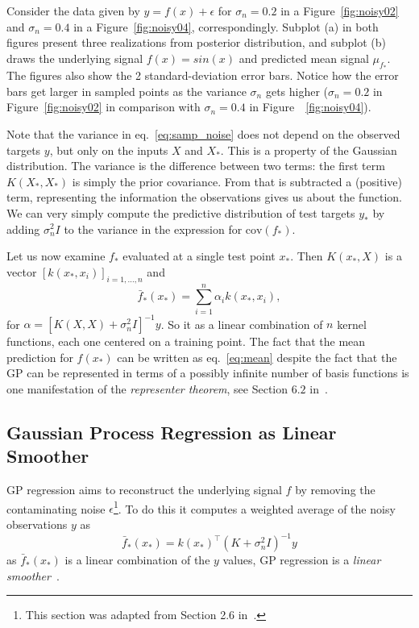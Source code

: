 \documentclass{article}[12pt]
\def\eps{\epsilon}
\newcommand{\cov}{\mathrm{cov}}
\begin{document}
Consider the data given by $y=f(x)+\eps$ for $\sigma_n=0.2$ in a Figure~\ref{fig:noisy02} and $\sigma_n=0.4$ in a Figure~\ref{fig:noisy04}, correspondingly. 
Subplot (a) in both figures present three realizations from posterior distribution, and subplot (b) draws the underlying signal $f(x)=sin(x)$ and predicted mean signal $\mu_{f_*}$.
The figures also show the 2 standard-deviation error bars. Notice how the error bars get larger in sampled points as the variance $\sigma_n$ gets higher ($\sigma_n=0.2$ in Figure~\ref{fig:noisy02} in comparison with $\sigma_n=0.4$ in Figure~~\ref{fig:noisy04}).

Note that the variance in eq.~\eqref{eq:samp_noise} does not depend on the observed targets $y$, but only on the inputs $X$ and $X_*$. This is a property of the Gaussian distribution.
The variance is the difference between two terms: the first term $K(X_*, X_*)$ is simply the prior covariance. From that is subtracted a (positive) term, representing the information the observations gives us about the function. 
We can very simply compute the predictive distribution of test targets $y_*$ by adding $\sigma_n^2 I$ to the variance in the expression for $\cov(f_*)$.


Let us now examine $f_*$ evaluated at a single test point $x_*$. Then $K(x_*,X)$ is a vector $[k(x_*,x_i)]_{i=1,\ldots,n}$ and
\begin{equation}
\label{eq:mean}
\bar{f}_*(x_*)=\sum\limits_{i=1}^n \alpha_i k(x_*,x_i),
\end{equation}
for $\alpha=[K(X,X)+\sigma_n^2I]^{-1}y$.
So it as a linear combination of $n$ kernel functions, each one centered on a training point.
The fact that the mean prediction for $f(x_*)$ can be
written as eq.~\eqref{eq:mean} despite the fact that the GP can be represented in terms of a possibly infinite number of basis functions is one manifestation of the
\textit{representer theorem}, see Section $6.2$ in~\cite{rasmussen:williams:2006}.
\subsection{Gaussian Process Regression as Linear Smoother}
GP regression aims to reconstruct the underlying signal $f$ by removing the contaminating noise $\eps$\footnote{This section was adapted from Section 2.6 in~\cite{rasmussen:williams:2006}.}.
To do this it computes a weighted average of the noisy observations $y$ as
\begin{equation}
\bar{f}_*(x_*) = k(x_*)^\top (K+\sigma_n^2 I)^{-1}y
\end{equation}
as $\bar{f}_*(x_*)$ is a linear
combination of the $y$ values, GP regression is a \textit{linear smoother}~\cite{Hastie90generalizedadditive}.
\end{document}
